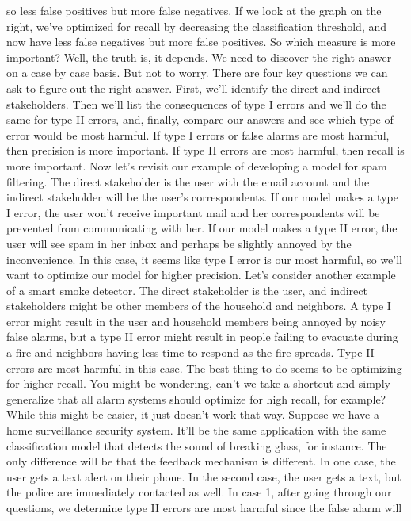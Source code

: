 so less false positives but more false negatives.
If we look at the graph on the right, we've
optimized for recall by decreasing the classification threshold,
and now have less false negatives but more false positives.
So which measure is more important?
Well, the truth is, it depends.
We need to discover the right answer on a case by case basis.
But not to worry.
There are four key questions we can ask to figure out the right answer.
First, we'll identify the direct and indirect stakeholders.
Then we'll list the consequences of type I errors and we'll
do the same for type II errors, and, finally, compare our answers
and see which type of error would be most harmful.
If type I errors or false alarms are most harmful,
then precision is more important.
If type II errors are most harmful, then recall is more important.
Now let's revisit our example of developing a model for spam filtering.
The direct stakeholder is the user with the email account
and the indirect stakeholder will be the user's correspondents.
If our model makes a type I error, the user won't receive important mail
and her correspondents will be prevented from communicating with her.
If our model makes a type II error, the user will see spam in her inbox
and perhaps be slightly annoyed by the inconvenience.
In this case, it seems like type I error is our most harmful,
so we'll want to optimize our model for higher precision.
Let's consider another example of a smart smoke detector.
The direct stakeholder is the user, and indirect stakeholders
might be other members of the household and neighbors.
A type I error might result in the user and household members
being annoyed by noisy false alarms, but a type II error
might result in people failing to evacuate
during a fire and neighbors having less time to respond as the fire spreads.
Type II errors are most harmful in this case.
The best thing to do seems to be optimizing for higher recall.
You might be wondering, can't we take a shortcut
and simply generalize that all alarm systems should
optimize for high recall, for example?
While this might be easier, it just doesn't work that way.
Suppose we have a home surveillance security system.
It'll be the same application with the same classification
model that detects the sound of breaking glass, for instance.
The only difference will be that the feedback mechanism is different.
In one case, the user gets a text alert on their phone.
In the second case, the user gets a text,
but the police are immediately contacted as well.
In case 1, after going through our questions,
we determine type II errors are most harmful since the false alarm will
